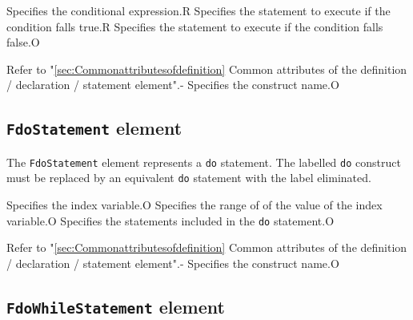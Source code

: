 \begin{XcodeMLChildElements}
{Specifies the conditional expression.}{R}
{Specifies the statement to execute if the condition falls true.}{R}
{Specifies the statement to execute if the condition falls false.}{O}
\end{XcodeMLChildElements}

\begin{XcodeMLAttributes}
{Refer to "\ref{sec:Commonattributesofdefinition} Common attributes of the definition / declaration / statement element".}{-}
{Specifies the construct name.}{O}
\end{XcodeMLAttributes}


\subsection{ {\tt FdoStatement} element}

The {\tt FdoStatement} element represents a {\tt do} statement.
The labelled {\tt do} construct must be replaced by an equivalent {\tt do} statement with the label eliminated.


\begin{XcodeMLChildElements}
{Specifies the index variable.}{O}
{Specifies the range of of the value of the index variable.}{O}
{Specifies the statements included in the {\tt do} statement.}{O}
\end{XcodeMLChildElements}

\begin{XcodeMLAttributes}
{Refer to "\ref{sec:Commonattributesofdefinition} Common attributes of the definition / declaration / statement element".}{-}
{Specifies the construct name.}{O}
\end{XcodeMLAttributes}


\subsection{ {\tt FdoWhileStatement} element}

